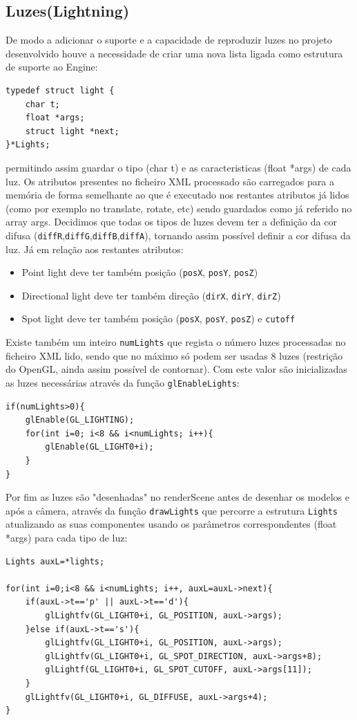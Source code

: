 \documentclass{article}
\begin{document}
\subsection{Luzes(Lightning)}
De modo a adicionar o suporte e a capacidade de reproduzir luzes no projeto desenvolvido houve a necessidade de criar uma nova lista ligada como estrutura de suporte ao Engine:
\begin{verbatim}
typedef struct light {
    char t;
    float *args;
    struct light *next;
}*Lights;
\end{verbatim}
permitindo assim guardar o tipo (char t) e as caracteristicas (float *args) de cada luz. Os atributos presentes no ficheiro XML processado são carregados para a memória de forma semelhante ao que é executado nos restantes atributos já lidos (como por exemplo no translate, rotate, etc) sendo guardados como já referido no array args. Decidimos que todas os tipos de luzes devem ter a definição da cor difusa (\texttt{diffR},\texttt{diffG},\texttt{diffB},\texttt{diffA}), tornando assim possível definir a cor difusa da luz. Já em relação aos restantes atributos:
\begin{itemize}
    \item Point light deve ter também posição (\texttt{posX}, \texttt{posY}, \texttt{posZ})
    \item Directional light deve ter também direção (\texttt{dirX}, \texttt{dirY}, \texttt{dirZ})
    \item Spot light deve ter também posição (\texttt{posX}, \texttt{posY}, \texttt{posZ}) e \texttt{cutoff}
\end{itemize}
Existe também um inteiro \texttt{numLights} que regista o número luzes processadas no ficheiro XML lido,  sendo que no máximo só podem ser usadas 8 luzes (restrição do OpenGL, ainda assim possível de contornar).
Com este valor são inicializadas as luzes necessárias através da função \texttt{glEnableLights}:
\begin{verbatim}
if(numLights>0){
    glEnable(GL_LIGHTING);
    for(int i=0; i<8 && i<numLights; i++){
        glEnable(GL_LIGHT0+i);
    }
} 
\end{verbatim}
Por fim as luzes são "desenhadas" no renderScene antes de desenhar os modelos e após a câmera, através da função \texttt{drawLights} que percorre a estrutura \texttt{Lights} atualizando as suas componentes usando os parâmetros correspondentes (float *args) para cada tipo de luz:
\begin{verbatim}
Lights auxL=*lights;

for(int i=0;i<8 && i<numLights; i++, auxL=auxL->next){
    if(auxL->t=='p' || auxL->t=='d'){
        glLightfv(GL_LIGHT0+i, GL_POSITION, auxL->args);
    }else if(auxL->t=='s'){
        glLightfv(GL_LIGHT0+i, GL_POSITION, auxL->args);
        glLightfv(GL_LIGHT0+i, GL_SPOT_DIRECTION, auxL->args+8);
        glLightf(GL_LIGHT0+i, GL_SPOT_CUTOFF, auxL->args[11]);
    }
    glLightfv(GL_LIGHT0+i, GL_DIFFUSE, auxL->args+4);
}
\end{verbatim}
\end{document}
